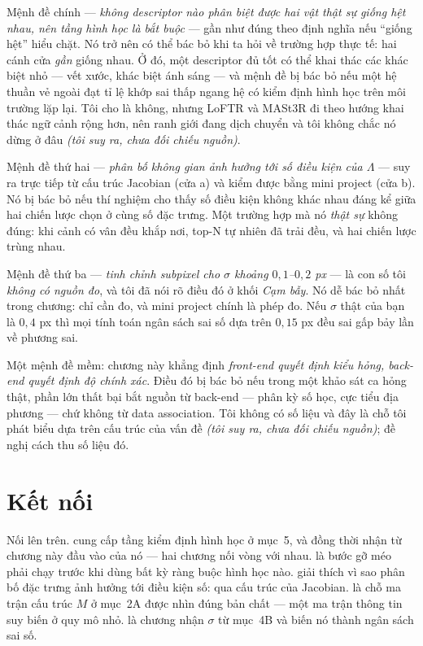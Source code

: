 \documentclass[../../vslam.tex]{subfiles}
\begin{document}
Mệnh đề chính --- \emph{không descriptor nào phân biệt được hai vật thật sự giống hệt nhau, nên tầng hình học là bắt buộc} --- gần như đúng theo định nghĩa nếu ``giống hệt'' hiểu chặt. Nó trở nên có thể bác bỏ khi ta hỏi về trường hợp thực tế: hai cánh cửa \emph{gần} giống nhau. Ở đó, một descriptor đủ tốt có thể khai thác các khác biệt nhỏ --- vết xước, khác biệt ánh sáng --- và mệnh đề bị bác bỏ nếu một hệ thuần vẻ ngoài đạt tỉ lệ khớp sai thấp ngang hệ có kiểm định hình học trên môi trường lặp lại. Tôi cho là không, nhưng LoFTR và MASt3R đi theo hướng khai thác ngữ cảnh rộng hơn, nên ranh giới đang dịch chuyển và tôi không chắc nó dừng ở đâu \emph{(tôi suy ra, chưa đối chiếu nguồn)}.

Mệnh đề thứ hai --- \emph{phân bố không gian ảnh hưởng tới số điều kiện của \(\Lambda\)} --- suy ra trực tiếp từ cấu trúc Jacobian (cửa a) và kiểm được bằng mini project (cửa b). Nó bị bác bỏ nếu thí nghiệm cho thấy số điều kiện không khác nhau đáng kể giữa hai chiến lược chọn ở cùng số đặc trưng. Một trường hợp mà nó \emph{thật sự} không đúng: khi cảnh có vân đều khắp nơi, top-N tự nhiên đã trải đều, và hai chiến lược trùng nhau.

Mệnh đề thứ ba --- \emph{tinh chỉnh subpixel cho \(\sigma\) khoảng \(0{,}1\)--\(0{,}2\) px} --- là con số tôi \emph{không có nguồn đo}, và tôi đã nói rõ điều đó ở khối \emph{Cạm bẫy}. Nó dễ bác bỏ nhất trong chương: chỉ cần đo, và mini project chính là phép đo. Nếu \(\sigma\) thật của bạn là \(0{,}4\) px thì mọi tính toán ngân sách sai số dựa trên \(0{,}15\) px đều sai gấp bảy lần về phương sai.

Một mệnh đề mềm: chương này khẳng định \emph{front-end quyết định kiểu hỏng, back-end quyết định độ chính xác}. Điều đó bị bác bỏ nếu trong một khảo sát ca hỏng thật, phần lớn thất bại bắt nguồn từ back-end --- phân kỳ số học, cực tiểu địa phương --- chứ không từ data association. Tôi không có số liệu và đây là chỗ tôi phát biểu dựa trên cấu trúc của vấn đề \emph{(tôi suy ra, chưa đối chiếu nguồn)};  đề nghị cách thu số liệu đó.

\section{Kết nối}

Nối lên trên.  cung cấp tầng kiểm định hình học ở mục~5, và đồng thời nhận từ chương này đầu vào của nó --- hai chương nối vòng với nhau.  là bước gỡ méo phải chạy trước khi dùng bất kỳ ràng buộc hình học nào.  giải thích vì sao phân bố đặc trưng ảnh hưởng tới điều kiện số: qua cấu trúc của Jacobian.  là chỗ ma trận cấu trúc \(M\) ở mục~2A được nhìn đúng bản chất --- một ma trận thông tin suy biến ở quy mô nhỏ.  là chương nhận \(\sigma\) từ mục~4B và biến nó thành ngân sách sai số.
\end{document}
